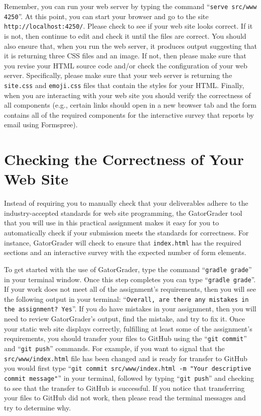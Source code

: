\documentclass[11pt]{article}
\newcommand{\mainprogram}{\lstinline{index.html}}
\newcommand{\mainprogramsource}{\lstinline{src/www/index.html}}
\newcommand{\gatorgraderstart}{\command{gradle grade}}
\newcommand{\gatorgradercheck}{\command{gradle grade}}
\newcommand{\gitcommit}{\command{git commit}}
\newcommand{\gitpush}{\command{git push}}
\newcommand{\gitcommitmainprogram}{\command{git commit src/www/index.html -m "Your
descriptive commit message"}}
\newcommand{\command}[1]{``\lstinline{#1}''}
\newcommand{\program}[1]{\lstinline{#1}}
\newcommand{\url}[1]{\lstinline{#1}}
\begin{document}
Remember, you can run your web server by typing the command \command{serve
src/www 4250}. At this point, you can start your browser and go to the site
\url{http://localhost:4250/}. Please check to see if your web site looks
correct. If it is not, then continue to edit and check it until the files are
correct. You should also ensure that, when you run the web server, it produces
output suggesting that it is returning three CSS files and an image. If not,
then please make sure that you revise your HTML source code and/or check the
configuration of your web server. Specifically, please make sure that your web
server is returning the \program{site.css} and \program{emoji.css} files that
contain the styles for your HTML. Finally, when you are interacting with your
web site you should verify the correctness of all components (e.g., certain
links should open in a new browser tab and the form contains all of the required
components for the interactive survey that reports by email using Formspree).

\section*{Checking the Correctness of Your Web Site}

Instead of requiring you to manually check that your deliverables adhere to the
industry-accepted standards for web site programming, the GatorGrader tool that
you will use in this practical assignment makes it easy for you to
automatically check if your submission meets the standards for correctness. For
instance, GatorGrader will check to ensure that \mainprogram{} has the required
sections and an interactive survey with the expected number of form elements.

To get started with the use of GatorGrader, type the command \gatorgraderstart{}
in your terminal window. Once this step completes you can type
\gatorgradercheck{}. If your work does not meet all of the assignment's
requirements, then you will see the following output in your terminal:
\command{Overall, are there any mistakes in the assignment? Yes}. If you do have
mistakes in your assignment, then you will need to review GatorGrader's output,
find the mistake, and try to fix it. Once your static web site displays
correctly, fulfilling at least some of the assignment's requirements, you should
transfer your files to GitHub using the \gitcommit{} and \gitpush{} commands.
For example, if you want to signal that the \mainprogramsource{} file has been
changed and is ready for transfer to GitHub you would first type
\gitcommitmainprogram{} in your terminal, followed by typing \gitpush{} and
checking to see that the transfer to GitHub is successful. If you notice that
transferring your files to GitHub did not work, then please read the terminal
messages and try to determine why.
\end{document}
